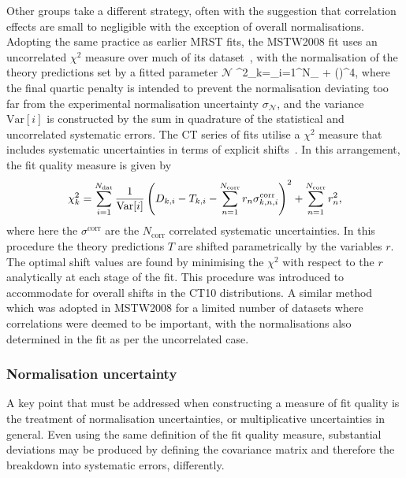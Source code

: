 Other groups take a different strategy, often with the suggestion that correlation effects are small to negligible with the exception of overall normalisations. Adopting the same practice as earlier MRST fits, the MSTW2008 fit uses an uncorrelated $\chi^2$ measure over much of its dataset~\cite{Martin:2009iq}, with the normalisation of the theory predictions set by a fitted parameter $\mathcal{N}$
\be \chi^2_k=\sum_{i=1}^{N_{}}  + \left(\right)^4, \label{eq:MSTWchi2}\ee 
where the final quartic penalty is intended to prevent the normalisation deviating too far from the experimental normalisation uncertainty $\sigma_{\mathcal{N}}$, and the variance $\mathrm{Var}[i]$ is constructed by the sum in quadrature of the statistical and uncorrelated systematic errors. The CT series of fits utilise a $\chi^2$ measure that includes systematic uncertainties in terms of explicit shifts~\cite{Stump:2001gu,Pumplin:2002vw}. In this arrangement, the fit quality measure is given by
\begin{equation} \label{eq:CTchi2}
\chi^{2}_k =  \sum_{i=1}^{N_{\mathrm{dat}}} \frac{1}{%
\mathrm{Var}[i]} \left(D_{k,i}-T_{k,i}-\sum_{n=1}^{N_{\mathrm{corr}}}r_{n}\sigma^{\mathrm{corr}}_{k,n,i}\right)^{2}
+\sum_{n=1}^{N_{\mathrm{corr}}} r_{n}^{2},
\end{equation}
where here the $\sigma^{\mathrm{corr}}$ are the $N_{\mathrm{corr}}$ correlated systematic uncertainties. In this procedure the theory predictions $T$ are shifted parametrically by the variables $r$. The optimal shift values are found by minimising the $\chi^2$ with respect to the $r$ analytically at each stage of the fit. This procedure was introduced to accommodate for overall shifts in the CT10 distributions. A similar method which was adopted in MSTW2008 for a limited number of datasets where correlations were deemed to be important, with the normalisations also determined in the fit as per the uncorrelated case.

\subsubsection{Normalisation uncertainty}

A key point that must be addressed when constructing a measure of fit quality is the treatment of normalisation uncertainties, or multiplicative uncertainties in general. Even using the same definition of the fit quality measure, substantial deviations may be produced by defining the covariance matrix and therefore the breakdown into systematic errors, differently.

